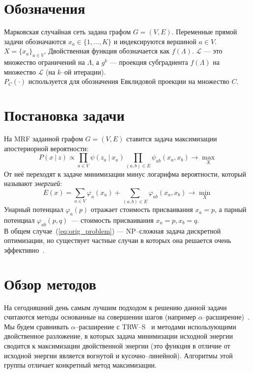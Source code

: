 \documentclass{article}
\begin{document}
\section{Обозначения}
Марковская случайная сеть задана графом $G = (V, E)$. Переменные прямой задачи обозначаются $x_a \in \{1, \dots, K\}$ и индексируются вершиной $a \in V$. $X = \{x_a\}_{a \in V}$. Двойственная функция обозначается как $f(\Lambda)$. $\mathcal{L}$ --- это множество ограничений на $\Lambda$, а $g^k$ --- проекция субградиента $f(\Lambda)$ на множество $\mathcal{L}$ (на $k$--ой итерации).\\
$P_C(\cdot)$ используется для обозначения Евклидовой проекции на множество $C$.

\section{Постановка задачи}
На MRF заданной графом $G = (V, E)$ ставится задача максимизации апостериорной вероятности:
\begin{equation*}
    P(x~|~z) \propto \prod_{a \in V} \psi (z_a~|~x_a) \prod_{(a,b) \in E} \psi_{ab} (x_{a}, x_{b}) \rightarrow \max_{X}
\end{equation*}
От неё переходят к задаче минимизации минус логарифма вероятности, который называют \textit{энергией}:
\begin{equation}
    E(x) = \sum_{a \in V} \varphi_a (x_a) + \sum_{(a,b) \in E} \varphi_{ab} (x_{a}, x_{b}) \rightarrow \min_{X}
    \label{eq:orig_problem}
\end{equation}
Унарный потенциал $\varphi_a (p)$ отражает стоимость присваивания $x_a = p$, а парный потенциал $\varphi_{ab} (p, q)$~--- стоимость присваивания $x_{a} = p, x_{b} = q$.\\
В общем случае~(\ref{eq:orig_problem}) --- NP--сложная задача дискретной оптимизации, но существует частные случаи в которых она решается очень эффективно~\cite{belief_propagation}.

\section{Обзор методов}
На сегодняшний день самым лучшим подходом к решению данной задачи считаются методы основанные на совершении шагов (например $\alpha$--расширение)~\cite{NewComparison}.
Мы будем сравнивать $\alpha$--расширение с TRW--S~\cite{TRWS} и методами использующими
двойственное разложение, в которых задача минимизации
исходной энергии сводится к максимизации
двойственной энергии (это функция в отличие от исходной энергии
является вогнутой и кусочно--линейной).
Алгоритмы этой группы отличает конкретный метод максимизации.
\end{document}
